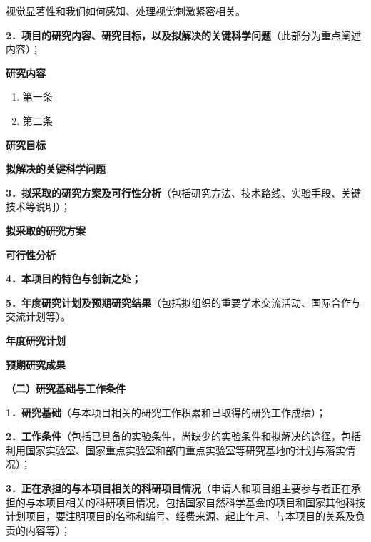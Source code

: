 \documentclass[14pt,a4paper]{extarticle}
\newcommand{\alert}[1]{\textcolor[rgb]{0.0625,0.4453,0.7383}{#1}}
\newcommand{\NsfcNote}[1]{\begin{spacing}{1.5} \alert{#1} \end{spacing}}
\newcommand{\NsfcSubNote}[1]{\alert{#1} \par}
\begin{document}
视觉显著性和我们如何感知、处理视觉刺激紧密相关\cite{huangzhiyong2011}。

{\small

\begin{spacing}{1}

\end{spacing}
}

\NsfcSubNote{\textbf{2．项目的研究内容、研究目标，以及拟解决的关键科学问题}（此部分为重点阐述内容）；}

\noindent\textbf{研究内容}
\begin{enumerate}[topsep=0pt,itemsep=0pt,parsep=0pt,leftmargin=20pt,listparindent=\parindent]
\item[\ding{172}] 第一条
\item[\ding{173}] 第二条
\end{enumerate}

\bigbreak

\noindent\textbf{研究目标}

\bigbreak

\noindent\textbf{拟解决的关键科学问题}

\NsfcSubNote{\textbf{3．拟采取的研究方案及可行性分析}（包括研究方法、技术路线、实验手段、关键技术等说明）；}

\noindent\textbf{拟采取的研究方案}

\bigbreak

\noindent\textbf{可行性分析}

\NsfcSubNote{\textbf{4．本项目的特色与创新之处；}}

\NsfcSubNote{\textbf{5．年度研究计划及预期研究结果}（包括拟组织的重要学术交流活动、国际合作与交流计划等）。}

\noindent\textbf{年度研究计划}

\bigbreak

\noindent\textbf{预期研究成果}

\NsfcNote{\textbf{（二）研究基础与工作条件}}
\NsfcSubNote{\textbf{1．研究基础}（与本项目相关的研究工作积累和已取得的研究工作成绩）；}



\NsfcSubNote{\textbf{2．工作条件}（包括已具备的实验条件，尚缺少的实验条件和拟解决的途径，包括利用国家实验室、国家重点实验室和部门重点实验室等研究基地的计划与落实情况）；}



\NsfcSubNote{\textbf{3．正在承担的与本项目相关的科研项目情况}（申请人和项目组主要参与者正在承担的与本项目相关的科研项目情况，包括国家自然科学基金的项目和国家其他科技计划项目，要注明项目的名称和编号、经费来源、起止年月、与本项目的关系及负责的内容等）；}
\end{document}
